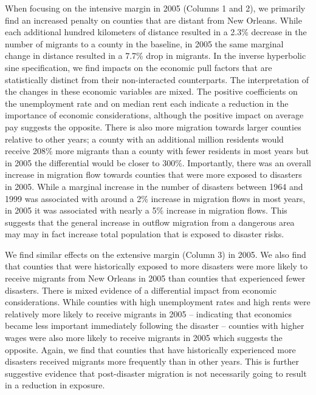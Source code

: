 \documentclass[]{article}
\begin{document}
When focusing on the intensive margin in 2005 (Columns 1 and 2), we
primarily find an increased penalty on counties that are distant from
New Orleans. While each additional hundred kilometers of distance
resulted in a 2.3\% decrease in the number of migrants to a county in
the baseline, in 2005 the same marginal change in distance resulted in a
7.7\% drop in migrants. In the inverse hyperbolic sine specification, we
find impacts on the economic pull factors that are statistically
distinct from their non-interacted counterparts. The interpretation of
the changes in these economic variables are mixed. The positive
coefficients on the unemployment rate and on median rent each indicate a
reduction in the importance of economic considerations, although the
positive impact on average pay suggests the opposite. There is also more
migration towards larger counties relative to other years; a county with
an additional million residents would receive 208\% more migrants than a
county with fewer residents in most years but in 2005 the differential
would be closer to 300\%. Importantly, there was an overall increase in
migration flow towards counties that were more exposed to disasters in
2005. While a marginal increase in the number of disasters between 1964
and 1999 was associated with around a 2\% increase in migration flows in
most years, in 2005 it was associated with nearly a 5\% increase in
migration flows. This suggests that the general increase in outflow
migration from a dangerous area may may in fact increase total
population that is exposed to disaster risks.

We find similar effects on the extensive margin (Column 3) in 2005. We
also find that counties that were historically exposed to more disasters
were more likely to receive migrants from New Orleans in 2005 than
counties that experienced fewer disasters. There is mixed evidence of a
differential impact from economic considerations. While counties with
high unemployment rates and high rents were relatively more likely to
receive migrants in 2005 -- indicating that economics became less
important immediately following the disaster -- counties with higher
wages were also more likely to receive migrants in 2005 which suggests
the opposite. Again, we find that counties that have historically
experienced more disasters received migrants more frequently than in
other years. This is further suggestive evidence that post-disaster
migration is not necessarily going to result in a reduction in exposure.
\end{document}
